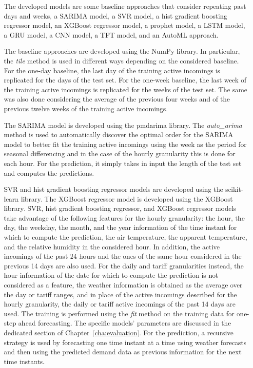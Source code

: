 The developed models are some baseline approaches that consider repeating past days and weeks, a SARIMA model, a SVR model, a hist gradient boosting regressor model, an XGBoost regressor model, a prophet model, a LSTM model, a GRU model, a CNN model, a TFT model, and an AutoML approach.

The baseline approaches are developed using the NumPy library.
In particular, the \emph{tile} method is used in different ways depending on the considered baseline.
For the one-day baseline, the last day of the training active incomings is replicated for the days of the test set.
For the one-week baseline, the last week of the training active incomings is replicated for the weeks of the test set.
The same was also done considering the average of the previous four weeks and of the previous twelve weeks of the training active incomings.

The SARIMA model is developed using the pmdarima library.
The \emph{auto\_arima} method is used to automatically discover the optimal order for the SARIMA model to better fit the training active incomings using the week as the period for seasonal differencing and in the case of the hourly granularity this is done for each hour.
For the prediction, it simply takes in input the length of the test set and computes the predictions.

SVR and hist gradient boosting regressor models are developed using the scikit-learn library.
The XGBoost regressor model is developed using the XGBoost library.
SVR, hist gradient boosting regressor, and XGBoost regressor models take advantage of the following features for the hourly granularity: the hour, the day, the weekday, the month, and the year information of the time instant for which to compute the prediction, the air temperature, the apparent temperature, and the relative humidity in the considered hour.
In addition, the active incomings of the past 24 hours and the ones of the same hour considered in the previous 14 days are also used.
For the daily and tariff granularities instead, the hour information of the date for which to compute the prediction is not considered as a feature, the weather information is obtained as the average over the day or tariff ranges, and in place of the active incomings described for the hourly granularity, the daily or tariff active incomings of the past 14 days are used.
The training is performed using the \emph{fit} method on the training data for one-step ahead forecasting.
The specific models' parameters are discussed in the dedicated section of Chapter~\ref{cha:evaluation}.
For the prediction, a recursive strategy is used by forecasting one time instant at a time using weather forecasts and then using the predicted demand data as previous information for the next time instants.

